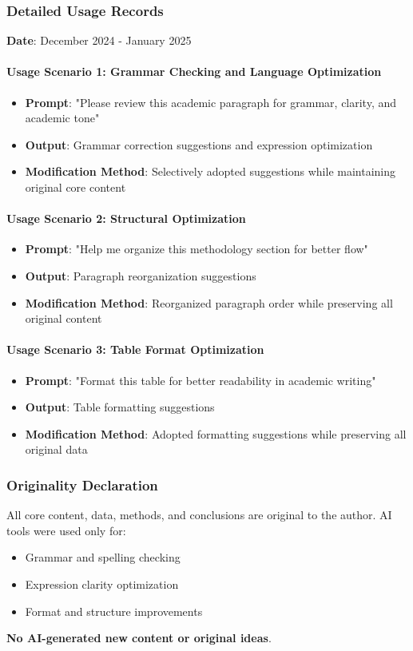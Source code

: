 \documentclass[12pt, a4paper]{article}
\begin{document}
\subsubsection{Detailed Usage Records}
\textbf{Date}: December 2024 - January 2025

\paragraph{Usage Scenario 1: Grammar Checking and Language Optimization}
\begin{itemize}
    \item \textbf{Prompt}: "Please review this academic paragraph for grammar, clarity, and academic tone"
    \item \textbf{Output}: Grammar correction suggestions and expression optimization
    \item \textbf{Modification Method}: Selectively adopted suggestions while maintaining original core content
\end{itemize}

\paragraph{Usage Scenario 2: Structural Optimization}
\begin{itemize}
    \item \textbf{Prompt}: "Help me organize this methodology section for better flow"
    \item \textbf{Output}: Paragraph reorganization suggestions
    \item \textbf{Modification Method}: Reorganized paragraph order while preserving all original content
\end{itemize}

\paragraph{Usage Scenario 3: Table Format Optimization}
\begin{itemize}
    \item \textbf{Prompt}: "Format this table for better readability in academic writing"
    \item \textbf{Output}: Table formatting suggestions
    \item \textbf{Modification Method}: Adopted formatting suggestions while preserving all original data
\end{itemize}

\subsubsection{Originality Declaration}
All core content, data, methods, and conclusions are original to the author. AI tools were used only for:
\begin{itemize}
    \item Grammar and spelling checking
    \item Expression clarity optimization
    \item Format and structure improvements
\end{itemize}
\textbf{No AI-generated new content or original ideas}.
\clearpage
\end{document}
